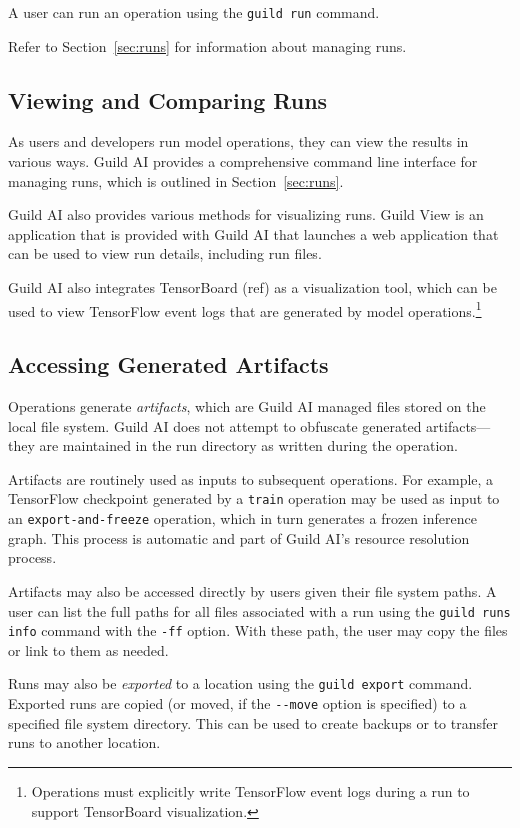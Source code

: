 \documentclass{article}
\begin{document}
A user can run an operation using the \verb|guild run| command.

Refer to Section~\ref{sec:runs} for information about managing runs.

\subsection{Viewing and Comparing Runs}

As users and developers run model operations, they can view the
results in various ways. Guild AI provides a comprehensive command
line interface for managing runs, which is outlined in
Section~\ref{sec:runs}.

Guild AI also provides various methods for visualizing runs. Guild
View is an application that is provided with Guild AI that launches a
web application that can be used to view run details, including run
files.

Guild AI also integrates TensorBoard (ref) as a visualization tool,
which can be used to view TensorFlow event logs that are generated by
model operations.\footnote{Operations must explicitly write TensorFlow
  event logs during a run to support TensorBoard visualization.}

\subsection{Accessing Generated Artifacts}

Operations generate \emph{artifacts}, which are Guild AI managed files
stored on the local file system. Guild AI does not attempt to
obfuscate generated artifacts---they are maintained in the run
directory as written during the operation.

Artifacts are routinely used as inputs to subsequent operations. For
example, a TensorFlow checkpoint generated by a \verb|train| operation
may be used as input to an \verb|export-and-freeze| operation, which
in turn generates a frozen inference graph. This process is automatic
and part of Guild AI's resource resolution process.

Artifacts may also be accessed directly by users given their file
system paths. A user can list the full paths for all files associated
with a run using the \verb|guild runs info| command with the
\verb|-ff| option. With these path, the user may copy the files or
link to them as needed.

Runs may also be \emph{exported} to a location using the
\verb|guild export| command. Exported runs are copied (or moved, if
the \verb|--move| option is specified) to a specified file system
directory. This can be used to create backups or to transfer runs to
another location.
\end{document}
